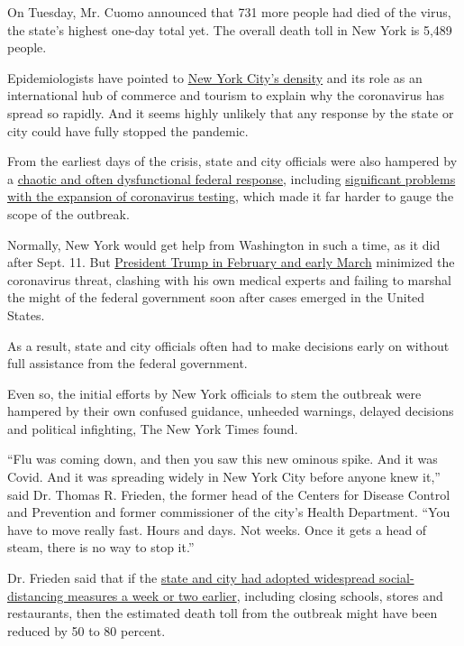 On Tuesday, Mr. Cuomo announced that 731 more people had died of the
virus, the state's highest one-day total yet. The overall death toll in
New York is 5,489 people.

Epidemiologists have pointed to
\href{https://www.nytimes3xbfgragh.onion/2020/03/23/nyregion/coronavirus-nyc-crowds-density.html}{New
York City's density} and its role as an international hub of commerce
and tourism to explain why the coronavirus has spread so rapidly. And it
seems highly unlikely that any response by the state or city could have
fully stopped the pandemic.

From the earliest days of the crisis, state and city officials were also
hampered by a
\href{https://www.nytimes3xbfgragh.onion/2020/07/18/us/politics/trump-coronavirus-response-failure-leadership.html}{chaotic
and often dysfunctional federal response}, including
\href{https://www.nytimes3xbfgragh.onion/2020/03/28/us/testing-coronavirus-pandemic.html}{significant
problems with the expansion of coronavirus testing}, which made it far
harder to gauge the scope of the outbreak.

Normally, New York would get help from Washington in such a time, as it
did after Sept. 11. But
\href{https://www.nytimes3xbfgragh.onion/2020/04/01/us/politics/coronavirus-trump.html}{President
Trump in February and early March} minimized the coronavirus threat,
clashing with his own medical experts and failing to marshal the might
of the federal government soon after cases emerged in the United States.

As a result, state and city officials often had to make decisions early
on without full assistance from the federal government.

Even so, the initial efforts by New York officials to stem the outbreak
were hampered by their own confused guidance, unheeded warnings, delayed
decisions and political infighting, The New York Times found.

``Flu was coming down, and then you saw this new ominous spike. And it
was Covid. And it was spreading widely in New York City before anyone
knew it,'' said Dr. Thomas R. Frieden, the former head of the Centers
for Disease Control and Prevention and former commissioner of the city's
Health Department. ``You have to move really fast. Hours and days. Not
weeks. Once it gets a head of steam, there is no way to stop it.''

Dr. Frieden said that if the
\href{https://twitter.com/DrTomFrieden/status/1247184873615433729}{state
and city had adopted widespread social-distancing measures a week or two
earlier}, including closing schools, stores and restaurants, then the
estimated death toll from the outbreak might have been reduced by 50 to
80 percent.

